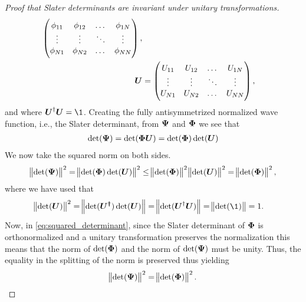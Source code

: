 \begin{proof}[Proof that Slater determinants are invariant under unitary
            transformations]
\begin{align}
\begin{pmatrix}
                    \phi_{11} & \phi_{12} & \dots & \phi_{1N} \\
                    \vdots & \vdots & \ddots & \vdots \\
                    \phi_{N1} & \phi_{N2} & \dots & \phi_{NN}
                \end{pmatrix}, \\
                \boldsymbol{U}
                &= \begin{pmatrix}
                    U_{11} & U_{12} & \dots & U_{1N} \\
                    \vdots & \vdots & \ddots & \vdots \\
                    U_{N1} & U_{N2} & \dots & U_{NN}
                \end{pmatrix},
            \end{align}
            and where $\vfg{U}^{\dagger}\vfg{U} = \1$.
            Creating the fully antisymmetrized normalized wave function, i.e.,
            the Slater determinant, from $\boldsymbol{\Psi}$ and $\boldsymbol{\Phi}$ we see
            that
            \begin{gather}
                \det(\boldsymbol{\Psi}) = \det(\boldsymbol{\Phi}\boldsymbol{U})
                = \det(\boldsymbol{\Phi})\det(\boldsymbol{U})
            \end{gather}
            We now take the squared norm on both sides.
            \begin{align}
                \norm{\det(\boldsymbol{\Psi})}^2
                = \norm{\det(\boldsymbol{\Phi})\det(\boldsymbol{U})}^2
                \leq
                \norm{\det(\boldsymbol{\Phi})}^2\norm{\det(\boldsymbol{U})}^2
                = \norm{\det(\boldsymbol{\Phi})}^2,
                \label{eq:squared_determinant}
            \end{align}
            where we have used that
            \begin{align}
                \norm{\det(\vfg{U})}^2
                &= \norm{\det(\vfg{U^{\dagger}})\det(\vfg{U})}
                = \norm{\det(\vfg{U}^{\dagger}\vfg{U})}
                = \norm{\det(\1)} = 1.
            \end{align}
            Now, in \autoref{eq:squared_determinant}, since the Slater
            determinant of $\boldsymbol{\Phi}$ is orthonormalized and a unitary
            transformation preserves the normalization this means that the norm
            of $\det(\boldsymbol{\Phi})$ and the norm of $\det(\boldsymbol{\Psi})$ must be
            unity.  Thus, the equality in the splitting of the norm is preserved
            thus yielding
            \begin{gather}
                \norm{\det(\boldsymbol{\Psi})}^2 = \norm{\det(\boldsymbol{\Phi})}^2.
            \end{gather}
        \end{proof}


